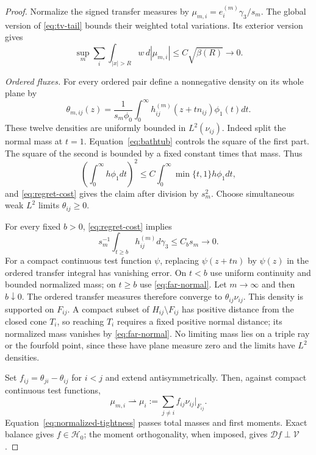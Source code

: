 \documentclass[11pt,reqno]{amsart}
\theoremstyle{remark}
\newcommand{\ga}{\gamma}
\newcommand{\HH}{\mathcal H}
\newcommand{\DD}{\mathcal D}
\newcommand{\VV}{\mathcal V}
\begin{document}
\begin{proof}
Normalize the signed transfer measures by
$\mu_{m,i}=e_i^{(m)}\ga_3/s_m$.
The global version of \eqref{eq:tv-tail} bounds their weighted total
variations. Its exterior version gives
\begin{equation}\label{eq:normalized-tightness}
 \sup_m\sum_i\int_{|x|>R}w\,d|\mu_{m,i}|
 \le C\sqrt{\beta(R)}\longrightarrow0.
\end{equation}

\smallskip\noindent\emph{Ordered fluxes.}
For every ordered pair define a nonnegative density on its whole plane by
\begin{equation}\label{eq:theta}
 \theta_{m,ij}(z)=\frac1{s_m\phi_0}
 \int_0^\infty h_{ij}^{(m)}(z+tn_{ij})\phi_1(t)dt.
\end{equation}
These twelve densities are uniformly bounded in $L^2(\nu_{ij})$.
Indeed split the normal mass at $t=1$.
Equation~\eqref{eq:bathtub} controls the square of the first part.
The square of the second is bounded by a fixed constant times that mass.
Thus
\[
 \left(\int_0^\infty h\phi_1dt\right)^2
 \le C\int_0^\infty\min\{t,1\}h\phi_1dt,
\]
and \eqref{eq:regret-cost} gives the claim after division by $s_m^2$.
Choose simultaneous weak $L^2$ limits $\theta_{ij}\ge0$.

For every fixed $b>0$, \eqref{eq:regret-cost} implies
\begin{equation}\label{eq:far-normal}
 s_m^{-1}\int_{t\ge b}h_{ij}^{(m)}d\ga_3\le C_bs_m\to0.
\end{equation}
For a compact continuous test function $\psi$, replacing $\psi(z+tn)$
by $\psi(z)$ in the ordered transfer integral has vanishing error.
On $t<b$ use uniform continuity and bounded normalized mass; on $t\ge b$
use \eqref{eq:far-normal}. Let $m\to\infty$ and then $b\downarrow0$.
The ordered transfer measures therefore converge to $\theta_{ij}\nu_{ij}$.
This density is supported on $F_{ij}$. A compact subset of
$H_{ij}\setminus F_{ij}$ has positive distance from the closed cone
$T_i$, so reaching $T_i$ requires a fixed positive normal distance;
its normalized mass vanishes by \eqref{eq:far-normal}.
No limiting mass lies on a triple ray or the fourfold point, since these
have plane measure zero and the limits have $L^2$ densities.

Set $f_{ij}=\theta_{ji}-\theta_{ij}$ for $i<j$ and extend antisymmetrically.
Then, against compact continuous test functions,
\begin{equation}\label{eq:measure-limit}
 \mu_{m,i}\rightharpoonup
 \mu_i:=\sum_{j\ne i} f_{ij}\nu_{ij}|_{F_{ij}}.
\end{equation}
Equation~\eqref{eq:normalized-tightness} passes total masses and first
moments. Exact balance gives $f\in\HH_0$; the moment orthogonality,
when imposed, gives $\DD f\perp\VV$.


\end{proof}
\end{document}
